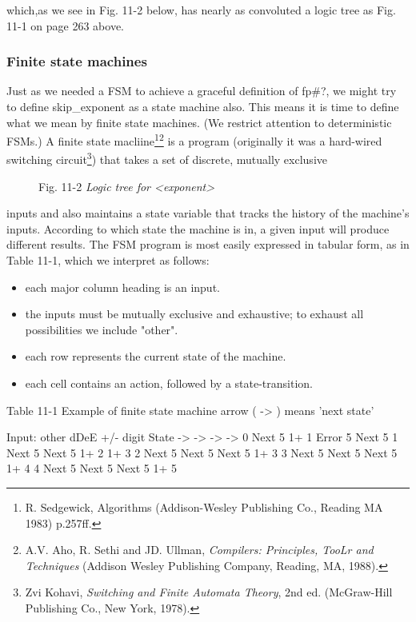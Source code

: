 which,as we see in Fig. 11-2 below, has nearly as convoluted a logic tree as Fig. 11-1 on page 263 above.

\subsubsection{Finite state machines}

Just as we needed a FSM to achieve a graceful definition of fp\#?, we might try to define skip\_exponent as a state machine also. This means it is time to define what we mean by finite state machines. (We restrict attention to deterministic FSMs.) A finite state macliine\footnote{R. Sedgewick, Algorithms (Addison-Wesley Publishing Co., Reading MA 1983) p.257ff.}\footnote{A.V. Aho, R. Sethi and JD. Ullman, \textit{Compilers: Principles, TooLr and Techniques} (Addison Wesley Publishing Company, Reading, MA, 1988).} is a program (originally it was a hard-wired switching circuit\footnote{Zvi Kohavi, \textit{Switching and Finite Automata Theory}, 2nd ed. (McGraw-Hill Publishing Co., New York, 1978).}) that takes a set of discrete, mutually exclusive

\begin{figure}
    \caption{ Fig. 11-2 \textit{Logic tree for <exponent>}}
\end{figure}

inputs and also maintains a state variable that tracks the history of the machine's inputs. According to which state the machine is in, a given input will produce different results. The FSM program is most easily expressed in tabular form, as in Table 11-1, which we interpret as follows:

\begin{itemize}
    \item each major column heading is an input.
    \item the inputs must be mutually exclusive and exhaustive; to exhaust all possibilities we include "other".
    \item each row represents the current state of the machine.
    \item each cell contains an action, followed by a state-transition.
\end{itemize}

Table 11-1 Example of finite state machine arrow ( -> ) means 'next state'

Input:  other       dDeE        +/-         digit
State         ->          ->          ->          ->
0       Next  5     1+    1     Error 5     Next  5
1       Next  5     Next  5     1+ 2  1+    3
2       Next  5     Next  5     Next  5     1+    3
3       Next  5     Next  5     Next  5     1+    4
4       Next  5     Next  5     Next  5     1+    5

